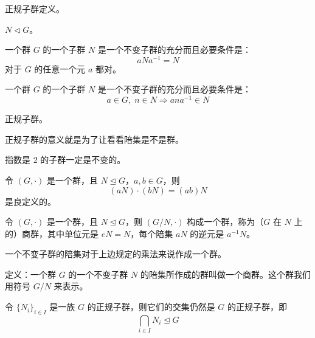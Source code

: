 \begin{definition}
正规子群定义。
\end{definition}

\begin{definition}[正规子群（定义 1.29）]
$N\triangleleft G$。
\end{definition}

\begin{theorem}[定理 1：不变子群的判定]
一个群 $G$ 的一个子群 $N$ 是一个不变子群的充分而且必要条件是：
\[
aNa^{-1}=N
\]
对于 $G$ 的任意一个元 $a$ 都对。
\end{theorem}

\begin{theorem}[定理 2：不变子群判定方式 2]
一个群 $G$ 的一个子群 $N$ 是一个不变子群的充分而且必要条件是：
\[
a\in G,\;n\in N\Rightarrow ana^{-1}\in N
\]
\end{theorem}

\begin{lemma}[引理 1.4]
正规子群。
\end{lemma}

\begin{note}[正规子群的意义]
正规子群的意义就是为了让看看陪集是不是群。
\end{note}

\begin{note}
指数是 2 的子群一定是不变的。
\end{note}

\begin{proposition}[命题 1.36：良定义]
令 $(G,\cdot)$ 是一个群，且 $N\trianglelefteq G$，$a,b\in G$，则
\[
(aN)\cdot(bN)=(ab)N
\]
是良定义的。
\end{proposition}

\begin{proposition}[命题 1.37：商群]
令 $(G,\cdot)$ 是一个群，且 $N\trianglelefteq G$，则 $(G/N,\cdot)$ 构成一个群，称为（$G$ 在 $N$ 上的）商群，其中单位元是 $eN=N$，每个陪集 $aN$ 的逆元是 $a^{-1}N$。
\end{proposition}

\begin{theorem}[定理 3：不变子群的陪集叫商群]
一个不变子群的陪集对于上边规定的乘法来说作成一个群。

定义：一个群 $G$ 的一个不变子群 $N$ 的陪集所作成的群叫做一个商群。这个群我们用符号 $G/N$ 来表示。
\end{theorem}

\begin{proposition}[命题 1.38：正规子群的交集还是正规子群]
令 $\{N_i\}_{i\in I}$ 是一族 $G$ 的正规子群，则它们的交集仍然是 $G$ 的正规子群，即
\[
\bigcap_{i\in I}N_i\trianglelefteq G
\]
\end{proposition}

